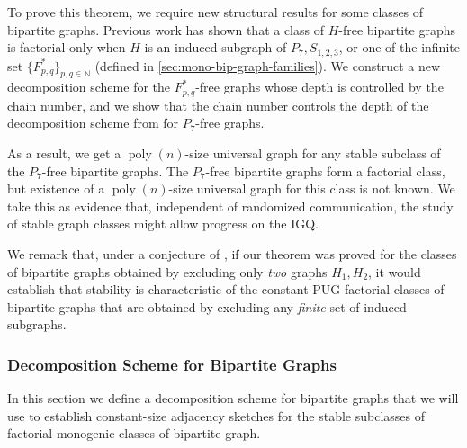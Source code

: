 \documentclass{article}
\makeatletter
\DeclareMathOperator{\poly}{poly}
\newcommand{\cF}{\ensuremath{\mathcal{F}}}
\newcommand{\bN}{\ensuremath{\mathbb{N}}}
\newcommand\IfRestateTF{%
  \ifx\label\thmt@gobble@label %
    \expandafter\@firstoftwo
  \else
    \expandafter\@secondoftwo
  \fi
}
\newcommand{\RestateRemark}{\IfRestateTF{{\normalfont\bfseries (Restated) }}{}}
\makeatother
\begin{document}

To prove this theorem, we require new structural results for some classes of bipartite graphs.
Previous work \cite{All09,LZ17} has shown that a class of $H$-free bipartite graphs is factorial
only when $H$ is an induced subgraph of $P_7, S_{1,2,3}$, or one of the infinite set
$\{F^*_{p,q}\}_{p,q \in \bN}$ (defined in \cref{sec:mono-bip-graph-families}). We construct a new
decomposition scheme for the $F^*_{p,q}$-free graphs whose depth is controlled by the chain number,
and we show that the chain number controls the depth of the decomposition scheme from  \cite{LZ17} for $P_7$-free graphs.

As a result, we get a $\poly(n)$-size universal graph for any stable subclass of the $P_7$-free
bipartite graphs. The $P_7$-free bipartite graphs form a factorial class, but existence of a
$\poly(n)$-size universal graph for this class is not known.
We take this as evidence that, independent of randomized communication, the study of stable graph classes 
might allow progress on the IGQ.

We remark that, under a conjecture of \cite{LZ17}, if our theorem was proved for the classes of
bipartite graphs obtained by excluding only \emph{two} graphs $H_1,H_2$, it would establish that
stability is characteristic of the constant-PUG factorial classes of bipartite graphs that are
obtained by excluding any \emph{finite} set of induced subgraphs.


\subsubsection{Decomposition Scheme for Bipartite Graphs}

In this section we define a decomposition scheme for bipartite graphs that we will use to establish
constant-size adjacency sketches for the stable subclasses of factorial monogenic classes of bipartite graph.
\end{document}
